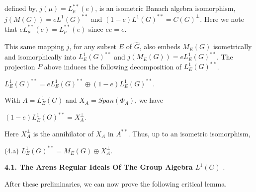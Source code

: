\documentclass[12pt, twoside, leqno]{article}
\theoremstyle{definition}
\theoremstyle{definition}
\numberwithin{equation}{section}
\begin{document}
\noindent defined by, $ j(\mu)=L_{\mu}^{**}(e) $, is an isometric Banach algebra isomorphism, $ j(M(G))=eL^{1}(G)^{**} $ and $ (1-e)L^{1}(G)^{**}=C(G)^{\perp} $. Here we note that $ eL_{\mu}^{**}(e)=L_{\mu}^{**}(e) $ since $ ee=e $.\vspace{2mm}

\noindent This same mapping $ j $, for any subset $ E $ of $ \hat{G} $, also embeds $ M_{E}(G) $ isometrically and isomorphically into $ L^{1}_{E}(G)^{**} $ and  $ j(M_{E}(G))=e L_{E}^{1}(G)^{**} $.  The projection $ P $ above induces the following decomposition of $ L^{1}_{E}(G)^{**} $. \vspace{3mm}
 
 $ L_{E}^{1}(G)^{**}=e L_{E}^{1}(G)^{**}\oplus (1-e) L_{E}^{1}(G)^{**} $.\vspace{3mm}
 
 \noindent With $A=L_{E}^{1}(G) $ and $X_{A}= \overline{Span(\Phi_{A})}$, we have\vspace{3mm}
 
  $ (1-e) L_{E}^{1}(G)^{**}=X_{A}^{\perp} $.\vspace{3mm}
  
  \noindent Here $ X_{A}^{\perp} $ is the annihilator of $ X_{A} $ in $ A^{**} $. Thus, up to an isometric isomorphism,\vspace{3mm}
 
 (4.a)\hspace{2mm}  $  L_{E}^{1}(G)^{**}=M_{E}(G)\oplus X_{A}^{\perp} $.\vspace{3mm}
 
 \textbf{4.1. The Arens Regular Ideals Of The Group Algebra $ L^{1}(G) $ }.\vspace{3mm}
 
 After these preliminaries, we can now prove the following critical lemma.
  
\end{document}
